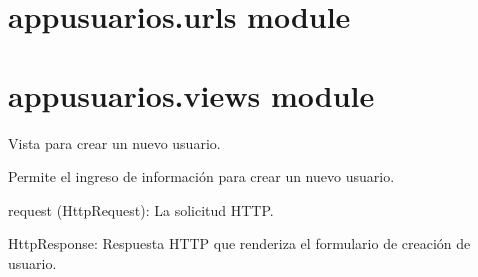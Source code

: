 \documentclass[letterpaper,10pt,spanish]{sphinxmanual}
\begin{document}
\section{appusuarios.urls module}
\label{\detokenize{modules/appusuarios:module-appusuarios.urls}}\label{\detokenize{modules/appusuarios:appusuarios-urls-module}}

\section{appusuarios.views module}
\label{\detokenize{modules/appusuarios:module-appusuarios.views}}\label{\detokenize{modules/appusuarios:appusuarios-views-module}}

\begin{fulllineitems}
\label{\detokenize{modules/appusuarios:appusuarios.views.crear}}
\pysigstartsignatures
{}
\pysigstopsignatures
\sphinxAtStartPar
Vista para crear un nuevo usuario.

\sphinxAtStartPar
Permite el ingreso de información para crear un nuevo usuario.
\begin{description}
\sphinxAtStartPar
request (HttpRequest): La solicitud HTTP.

\sphinxAtStartPar
HttpResponse: Respuesta HTTP que renderiza el formulario de creación de usuario.

\end{description}

\end{fulllineitems}

\end{document}
